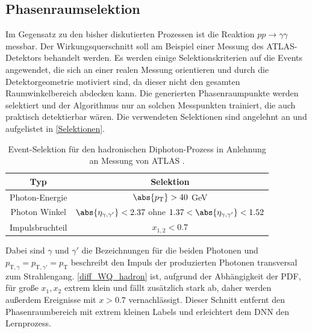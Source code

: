 \subsection{Phasenraumselektion}
Im Gegensatz zu den bisher diskutierten Prozessen ist die Reaktion $pp \rightarrow \gamma \gamma$ messbar. Der Wirkungsquerschnitt soll am Beispiel einer Messung des ATLAS-Detektors behandelt werden. Es werden einige Selektionskriterien auf die Events angewendet, die sich an einer realen Messung orientieren und durch die Detektorgeometrie motiviert sind, da dieser nicht den gesamten Raumwinkelbereich abdecken kann. Die generierten Phasenraumpunkte werden selektiert und der Algorithmus nur an solchen Messpunkten trainiert, die auch praktisch detektierbar wären. Die verwendeten Selektionen sind angelehnt an \cite{Cuts-Paper} und aufgelistet in \textsf{\autoref{Selektionen}}.
\begin{table}[bp]
	\centering
	\caption{Event-Selektion für den hadronischen Diphoton-Prozess in Anlehnung an Messung von ATLAS \cite{Cuts-Paper}.}
	\begin{tabular}{|c|c|}
		\hline
		Typ & Selektion \\
		\hline
		Photon-Energie & $\abs{p_\text{T}} > 40$ GeV \\
		Photon Winkel & $\abs{\eta_{\gamma, \gamma'}} < 2.37$ ohne $1.37 < \abs{\eta_{\gamma, \gamma'}} < 1.52$ \\
		Impulsbruchteil & $x_{1,2} < 0.7 $\\
		\hline
	\end{tabular}
	\label{Selektionen}
\end{table}
Dabei sind $\gamma$ und ${\gamma'}$ die Bezeichnungen für die beiden Photonen und $p_{\text{T},\gamma} = p_{\text{T},\gamma'} = p_\text{T}$ beschreibt den Impuls der produzierten Photonen transversal zum Strahlengang. \textsf{\autoref{diff_WQ_hadron}} ist, aufgrund der Abhängigkeit der PDF, für große $x_1, x_2$ extrem klein und fällt zusätzlich stark ab, daher werden außerdem Ereignisse mit $x > 0.7$ vernachlässigt. Dieser Schnitt entfernt den Phasenraumbereich mit extrem kleinen Labels und erleichtert dem DNN den Lernprozess. 



